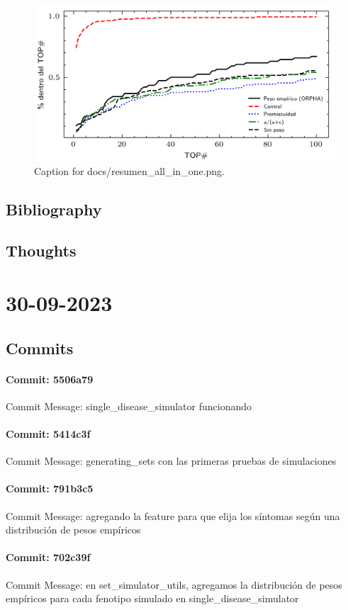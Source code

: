 \documentclass{article}
\begin{document}
\begin{figure}[h] \centering \includegraphics{docs/resumen_all_in_one.png} \caption{Caption for docs/resumen_all_in_one.png.} \end{figure}
\subsection{Bibliography}
\subsection{Thoughts}

\section{30-09-2023}
\subsection{Commits}
\paragraph{Commit: 5506a79}
Commit Message: single_disease_simulator funcionando

\paragraph{Commit: 5414c3f}
Commit Message: generating_sets con las primeras pruebas de simulaciones

\paragraph{Commit: 791b3c5}
Commit Message: agregando la feature para que elija los síntomas según una distribución de pesos empíricos

\paragraph{Commit: 702c39f}
Commit Message: en set_simulator_utils, agregamos la distribución de pesos empíricos para cada fenotipo simulado en single_disease_simulator
\end{document}
